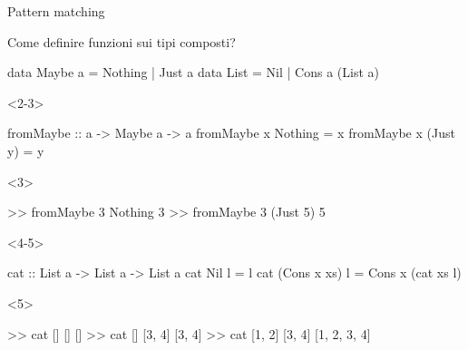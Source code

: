 \begin{frame}[fragile]{\secname}{Pattern matching}
\begin{overlayarea}{\textwidth}{0.7\textheight}
Come definire funzioni sui tipi composti?

\begin{haskellcode}
data Maybe a = Nothing | Just a
data List = Nil | Cons a (List a)
\end{haskellcode}

\begin{onlyenv}<2-3>
\begin{haskellcode}
fromMaybe :: a -> Maybe a -> a
fromMaybe x Nothing = x
fromMaybe x (Just y) = y
\end{haskellcode}
\end{onlyenv}

\begin{onlyenv}<3>
\begin{runhaskell}
>>  fromMaybe 3 Nothing
    3
>>  fromMaybe 3 (Just 5)
    5
\end{runhaskell}
\end{onlyenv}

\begin{onlyenv}<4-5>
\begin{haskellcode}
cat :: List a -> List a -> List a
cat Nil l = l
cat (Cons x xs) l = Cons x (cat xs l)
\end{haskellcode}
\end{onlyenv}

\begin{onlyenv}<5>
\begin{runhaskell}
>>  cat [] []
    []
>>  cat [] [3, 4]
    [3, 4]
>>  cat [1, 2] [3, 4]
    [1, 2, 3, 4]
\end{runhaskell}
\end{onlyenv}
\end{overlayarea}
\end{frame}